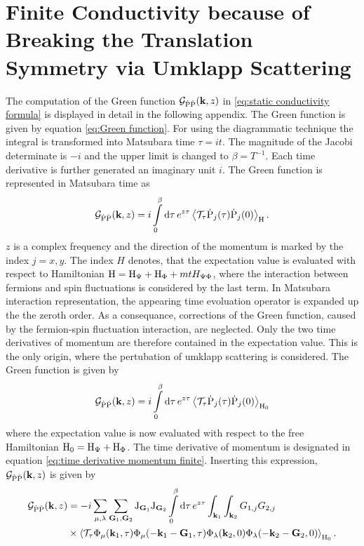 %
%
\chapter{Finite Conductivity because of Breaking the Translation Symmetry via Umklapp Scattering}
\label{appch:green function}
%
%
The computation of the Green function $\mathcal{G}_{\dot{\mathrm{P}}\dot{\mathrm{P}}}(\vb{k}, z)$ in \eqref{eq:static conductivity formula} is displayed in detail in the following appendix.
The Green function is given by equation \eqref{eq:Green function}.
For using the diagrammatic technique the integral is transformed into Matsubara time $\tau = it$.
The magnitude of the Jacobi determinate is $-i$ and the upper limit is changed to $\beta = T^{-1}$.
Each time derivative is further generated an imaginary unit $i$.
The Green function is represented in Matsubara time as
%
\begin{align}
	\mathcal{G}_{\dot{\mathrm{P}}\dot{\mathrm{P}}}(\vb{k}, z) = i \int\limits_{0}^{\beta} \dd{\tau} e^{z \tau} \expval{\mathcal{T}_{\tau} \dot{\mathrm{P}}_{j}(\tau) \dot{\mathrm{P}}_{j}(0)}_{\mathrm{H}}.
\end{align}
%
$z$ is a complex frequency and the direction of the momentum is marked by the index $j = x,y$.
The index $H$ denotes, that the expectation value is evaluated with respect to Hamiltonian $\mathrm{H} = \mathrm{H}_{\Psi} + \mathrm{H}_{\Phi} + mt{H}_{\Psi\Phi}$, where the interaction between fermions and spin fluctuations is considered by the last term.
In Matsubara interaction representation, the appearing time evoluation operator is expanded up the the zeroth order.
As a consequance, corrections of the Green function, caused by the fermion-spin fluctuation interaction, are neglected.
Only the two time derivatives of momentum are therefore contained in the expectation value.
This is the only origin, where the pertubation of umklapp scattering is considered.
The Green function is given by
%
\begin{align}
	\mathcal{G}_{\dot{\mathrm{P}}\dot{\mathrm{P}}}(\vb{k}, z) = i \int\limits_{0}^{\beta} \dd{\tau} e^{z \tau} \expval{\mathcal{T}_{\tau} \dot{\mathrm{P}}_{j}(\tau) \dot{\mathrm{P}}_{j}(0)}_{\mathrm{H}_{0}}
\end{align}
%
where the expectation value is now evaluated with respect to the free Hamiltonian $\mathrm{H}_{0} = \mathrm{H}_{\Psi} + \mathrm{H}_{\Phi}$.
The time derivative of momentum is designated in equation \eqref{eq:time derivative momentum finite}.
Inserting this expression, $\mathcal{G}_{\dot{\mathrm{P}}\dot{\mathrm{P}}}(\vb{k}, z)$ is given by
%
\begin{align}
	\mathcal{G}_{\dot{\mathrm{P}}\dot{\mathrm{P}}}(\vb{k}, z) &= 
		-i 
		\sum\limits_{\mu, \lambda}
		\sum\limits_{\vb{G}_{1}, \vb{G}_{2}} 
		\mathrm{J}_{\vb{G}_{1}} \mathrm{J}_{\vb{G}_{2}} 
		\int\limits_{0}^{\beta} \dd{\tau} e^{z \tau} 
		\int_{\vb{k}_{1}}\int_{\vb{k}_{2}} G_{1,j}  G_{2,j} 
		\notag \\
		&\times
		\expval{\mathcal{T}_{\tau} \Phi_{\mu}(\vb{k}_{1},\tau) \Phi_{\mu}(-\vb{k}_{1} - \vb{G}_{1},\tau) \Phi_{\lambda}(\vb{k}_{2},0) \Phi_{\lambda}(-\vb{k}_{2} - \vb{G}_{2},0)}_{\mathrm{H}_{0}}.
\end{align}
